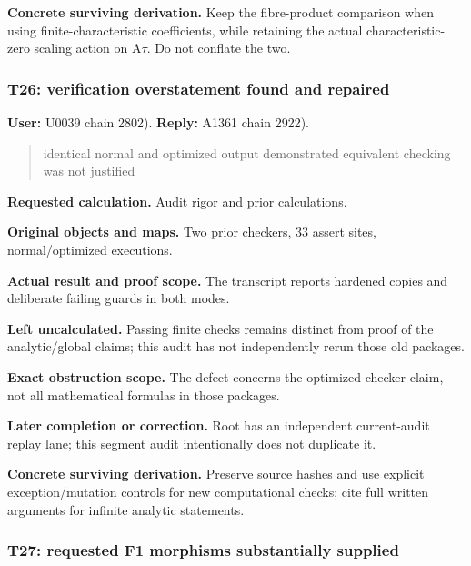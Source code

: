 \documentclass[10pt,a4paper,oneside]{report}
\begin{document}
\textbf{Concrete surviving derivation.} Keep the fibre-product
comparison when using finite-characteristic coefficients, while
retaining the actual characteristic-zero scaling action on
A\allowbreak{}\ensuremath{τ}\allowbreak{}. Do not conflate the two.

\subsubsection{T26: verification overstatement found and
repaired}\label{t26-verification-overstatement-found-and-repaired}

\textbf{User:} U0039
\protect{} chain 2802).
\textbf{Reply:} A1361
\protect{} chain 2922).

\begin{quote}
identical normal and optimized output demonstrated equivalent checking
was not justified
\end{quote}

\textbf{Requested calculation.} Audit rigor and prior calculations.

\textbf{Original objects and maps.} Two prior checkers, 33 assert sites,
normal/optimized executions.

\textbf{Actual result and proof scope.} The transcript reports hardened
copies and deliberate failing guards in both modes.

\textbf{Left uncalculated.} Passing finite checks remains distinct from
proof of the analytic/global claims; this audit has not independently
rerun those old packages.

\textbf{Exact obstruction scope.} The defect concerns the optimized
checker claim, not all mathematical formulas in those packages.

\textbf{Later completion or correction.} Root has an independent
current-audit replay lane; this segment audit intentionally does not
duplicate it.

\textbf{Concrete surviving derivation.} Preserve source hashes and use
explicit exception/mutation controls for new computational checks; cite
full written arguments for infinite analytic statements.

\subsubsection{T27: requested F1 morphisms substantially
supplied}\label{t27-requested-f1-morphisms-substantially-supplied}
\end{document}
